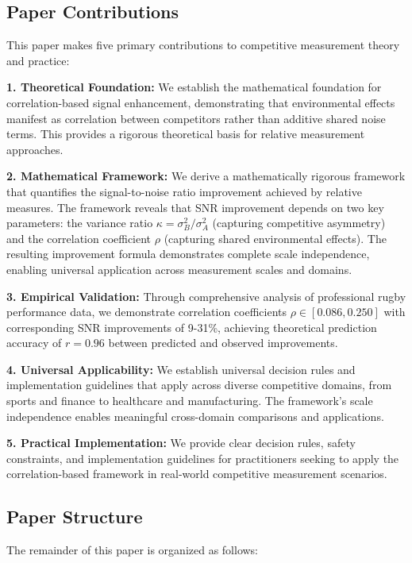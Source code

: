 \subsection{Paper Contributions}

This paper makes five primary contributions to competitive measurement theory and practice:

\textbf{1. Theoretical Foundation:}
We establish the mathematical foundation for correlation-based signal enhancement, demonstrating that environmental effects manifest as correlation between competitors rather than additive shared noise terms. This provides a rigorous theoretical basis for relative measurement approaches.

\textbf{2. Mathematical Framework:}
We derive a mathematically rigorous framework that quantifies the signal-to-noise ratio improvement achieved by relative measures. The framework reveals that SNR improvement depends on two key parameters: the variance ratio $\kappa = \sigma_B^2/\sigma_A^2$ (capturing competitive asymmetry) and the correlation coefficient $\rho$ (capturing shared environmental effects). The resulting improvement formula demonstrates complete scale independence, enabling universal application across measurement scales and domains.

\textbf{3. Empirical Validation:}
Through comprehensive analysis of professional rugby performance data, we demonstrate correlation coefficients $\rho \in [0.086, 0.250]$ with corresponding SNR improvements of 9-31\%, achieving theoretical prediction accuracy of $r = 0.96$ between predicted and observed improvements.

\textbf{4. Universal Applicability:}
We establish universal decision rules and implementation guidelines that apply across diverse competitive domains, from sports and finance to healthcare and manufacturing. The framework's scale independence enables meaningful cross-domain comparisons and applications.

\textbf{5. Practical Implementation:}
We provide clear decision rules, safety constraints, and implementation guidelines for practitioners seeking to apply the correlation-based framework in real-world competitive measurement scenarios.

\subsection{Paper Structure}

The remainder of this paper is organized as follows:

